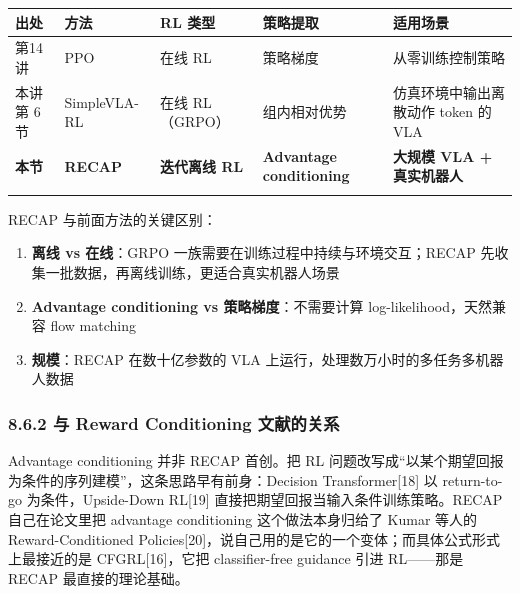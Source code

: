 \documentclass[
  chinese,
]{ctexart}
\providecommand{\tightlist}{%
  \setlength{\itemsep}{0pt}\setlength{\parskip}{0pt}}
\begin{document}
\begin{center}
\begin{tabular}{@{}>{\raggedright\arraybackslash}p{} >{\raggedright\arraybackslash}p{} >{\raggedright\arraybackslash}p{} >{\raggedright\arraybackslash}p{} >{\raggedright\arraybackslash}p{}@{}}
\toprule\noalign{}
出处 & 方法 & RL 类型 & 策略提取 & 适用场景 \\
\midrule\noalign{}
第14讲 & PPO & 在线 RL & 策略梯度 & 从零训练控制策略 \\
本讲第 6 节 & SimpleVLA-RL & 在线 RL（GRPO） & 组内相对优势 & 仿真环境中输出离散动作 token 的 VLA \\
\textbf{本节} & \textbf{RECAP} & \textbf{迭代离线 RL} & \textbf{Advantage conditioning} & \textbf{大规模 VLA + 真实机器人} \\
\bottomrule\noalign{}
\end{tabular}
\end{center}

RECAP 与前面方法的关键区别：

\begin{enumerate}
\def\labelenumi{\arabic{enumi}.}
\tightlist
\item
  \textbf{离线 vs 在线}：GRPO 一族需要在训练过程中持续与环境交互；RECAP
  先收集一批数据，再离线训练，更适合真实机器人场景
\item
  \textbf{Advantage conditioning vs 策略梯度}：不需要计算
  log-likelihood，天然兼容 flow matching
\item
  \textbf{规模}：RECAP 在数十亿参数的 VLA
  上运行，处理数万小时的多任务多机器人数据
\end{enumerate}

\subsubsection{8.6.2 与 Reward Conditioning
文献的关系}\label{ux4e0e-reward-conditioning-ux6587ux732eux7684ux5173ux7cfb}

Advantage conditioning 并非 RECAP 首创。把 RL
问题改写成``以某个期望回报为条件的序列建模''，这条思路早有前身：Decision
Transformer{[}18{]} 以 return-to-go 为条件，Upside-Down RL{[}19{]}
直接把期望回报当输入条件训练策略。RECAP 自己在论文里把 advantage
conditioning 这个做法本身归给了 Kumar 等人的 Reward-Conditioned
Policies{[}20{]}，说自己用的是它的一个变体；而具体公式形式上最接近的是
CFGRL{[}16{]}，它把 classifier-free guidance 引进 RL------那是 RECAP
最直接的理论基础。
\end{document}
